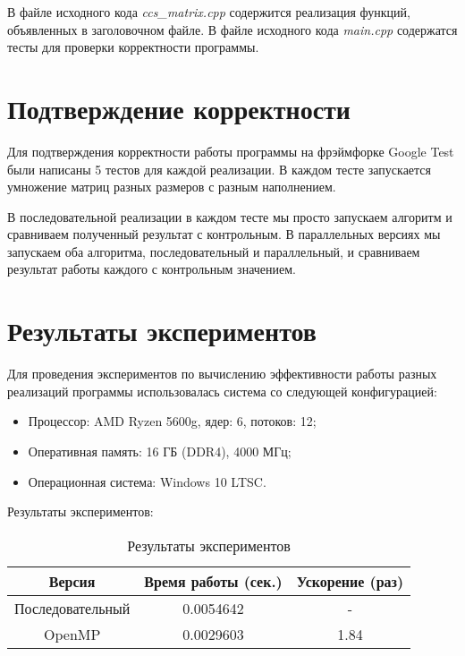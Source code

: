 \documentclass{report}
\begin{document}
\par В файле исходного кода \emph{ccs\_matrix.cpp} содержится реализация функций, объявленных в заголовочном файле. В файле исходного кода \emph{main.cpp} содержатся тесты для проверки корректности программы.
\newpage

\section*{Подтверждение корректности}
\par Для подтверждения корректности работы программы на фрэймфорке Google Test были написаны 5 тестов для каждой реализации. В каждом тесте запускается умножение матриц разных размеров с разным наполнением.
\par В последовательной реализации в каждом тесте мы просто запускаем алгоритм и сравниваем полученный результат с контрольным. В параллельных версиях мы запускаем оба алгоритма, последовательный и параллельный, и сравниваем результат работы каждого с контрольным значением.
\newpage

\section*{Результаты экспериментов}
Для проведения экспериментов по вычислению эффективности работы разных реализаций программы использовалась система со следующей конфигурацией:
\begin{itemize}
\item Процессор: AMD Ryzen 5600g, ядер: 6, потоков: 12;
\item Оперативная память: 16 ГБ (DDR4), 4000 МГц;
\item Операционная система: Windows 10 LTSC.
\end{itemize}

\par Результаты экспериментов:
\begin{table}[!h]
\centering
\begin{tabular}{| c | c | c |}
\hline
Версия & Время работы (сек.) & Ускорение (раз) \\
\hline
Последовательный        & 0.0054642        & -         \\
OpenMP        & 0.0029603        & 1.84          \\
\hline
\end{tabular}
\caption{Результаты экспериментов}
\end{table}
\end{document}
